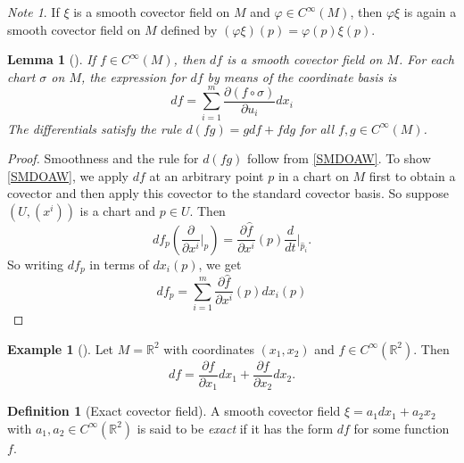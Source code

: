 \documentclass[reqno]{amsart}
\newtheorem{lemma}[theorem]{Lemma}
\theoremstyle{definition}
\newtheorem{definition}[theorem]{Definition}
\newtheorem{example}[theorem]{Example}
\theoremstyle{remark}
\newtheorem*{note}{Note}
\begin{document}
      \begin{note}
          If $\xi$ is a smooth covector field on
          $M$ and $\varphi  \in C^{\infty}(M)$, then
          $\varphi \xi$ is again a smooth covector field on
          $M$ defined by
          $\left( \varphi \xi \right) (p) = 
          \varphi (p) \xi(p)$.
      \end{note}

      \begin{lemma}[]
          If $f \in C^{\infty}(M)$, then
          $df$ is a smooth covector field on $M$.
          For each chart $\sigma $ on $M$, the expression
          for $df$ by means of the coordinate basis is
          \[
          df = \sum_{i=1}^{m} \frac{\partial (f \circ
          \sigma)}{\partial u_i} dx_i \tag{A}\label{SMDOAW}
          \] 
          The differentials satisfy the rule
          $d(fg) = g df + f dg$ for all
          $f,g \in C^{\infty}(M)$.
      \end{lemma}

      \begin{proof}
          Smoothness and the rule for 
          $d(fg)$ follow from
          \eqref{SMDOAW}.
          To show \eqref{SMDOAW}, we apply 
          $df$ at an arbitrary point $p$ in
          a chart on $M$ first to
          obtain a covector and then apply this covector
          to the standard covector basis.
          So suppose $\left( U, (x^{i}) \right) $ is a 
          chart and $p \in U$.
          Then
          \[
          df_p \left( \frac{\partial}{\partial x^{i}}|_p \right) 
          = \frac{\partial \widehat{f}}{\partial x^{i}}(p)
          \frac{d}{dt}|_{\widehat{p}_i}.
          \] 
          So writing
          $df_p$ in terms of
          $dx_i(p)$, we get
          \[
          df_p = \sum_{i=1}^{m} 
          \frac{\partial \widehat{f}}{\partial x^{i}}(p)
          dx_i(p)
          \] 
      \end{proof}

      \begin{example}[]
          Let $M = \mathbb{R}^2$ with coordinates
          $(x_1, x_2)$ and $f \in C^{\infty}(\mathbb{R}^2)$.
          Then
          \[
          df = \frac{\partial f}{\partial x_1} dx_1 +
          \frac{\partial f}{\partial x_2} dx_2.
          \] 
      \end{example}

      \begin{definition}[Exact covector field]
          A smooth covector field 
          $\xi = a_1 dx_1 + a_2 x_2$ with
          $a_1,a_2 \in C^{\infty}(\mathbb{R}^2)$ is said
          to be \textit{exact} if it has the form
          $df$ for some function $f$.
      \end{definition}
\end{document}
